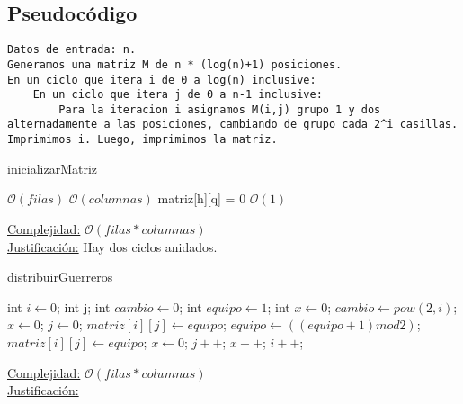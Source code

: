 \documentclass[10pt,a4paper]{article}
\begin{document}
\subsection{Pseudocódigo}
\begin{verbatim}
Datos de entrada: n.
Generamos una matriz M de n * (log(n)+1) posiciones.
En un ciclo que itera i de 0 a log(n) inclusive:
	En un ciclo que itera j de 0 a n-1 inclusive:
		Para la iteracion i asignamos M(i,j) grupo 1 y dos alternadamente a las posiciones, cambiando de grupo cada 2^i casillas.
Imprimimos i. Luego, imprimimos la matriz.
\end{verbatim}

\begin{algorithm}
\caption{inicializarMatriz}
\begin{algorithmic}
	 \Comment $\mathcal{O}(filas)$
		 \Comment $\mathcal{O}(columnas)$
		\State matriz[h][q] = 0 \Comment $\mathcal{O}(1)$
		\EndFor
	\EndFor

\EndFunction
\end{algorithmic}
\underline{Complejidad:} $\mathcal{O}(filas*columnas)$\\
    \underline{Justificación:} Hay dos ciclos anidados.
\end{algorithm}


\begin{algorithm}
\caption{distribuirGuerreros}
\begin{algorithmic}
	\State int $i \gets 0$;
	\State int j;	
	\State int $cambio \gets 0$;
	\State int $equipo \gets 1$;
	\State int $x \gets 0$;
		\State $cambio \gets pow(2,i)$;
		\State $x \gets 0$;
		\State $j \gets 0$;
				\State $matriz[i][j] \gets equipo$;
			\Else
				\State $equipo \gets ((equipo +1) mod 2)$;
				\State $matriz[i][j] \gets equipo$;
				\State $x \gets 0$;
			\EndIf
			\State $j++$;
			\State $x++$;
		\EndWhile
		\State $i++$;
	\EndWhile
\EndFunction
\end{algorithmic}
\underline{Complejidad:} $\mathcal{O}(filas*columnas)$\\
    \underline{Justificación:} 
\end{algorithm}
\end{document}
